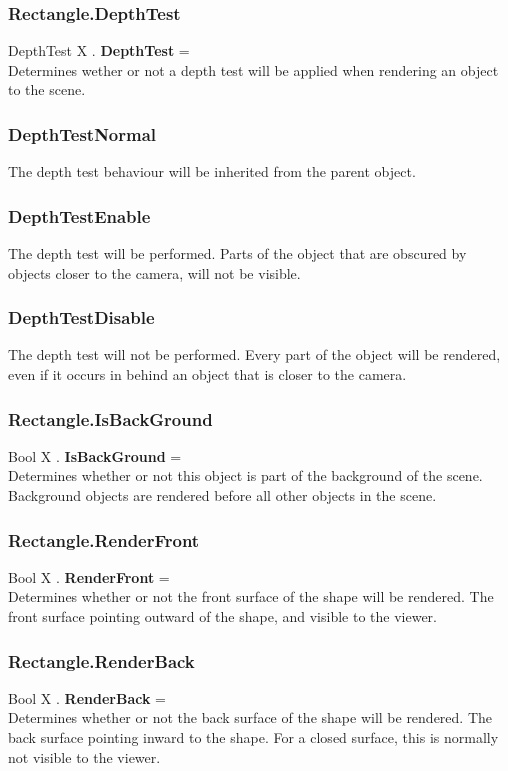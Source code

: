 \documentclass[10pt]{book}
\begin{document}
\subsubsection{Rectangle.DepthTest \label{F:Rectangle:DepthTest}}
DepthTest X . \textbf{DepthTest} = \\
Determines wether or not a depth test will be applied when rendering an object to the scene.

\subsubsection{DepthTestNormal \label{T:DepthTest|DepthTestNormal}}
The depth test behaviour will be inherited from the parent object.

\subsubsection{DepthTestEnable \label{T:DepthTest|DepthTestEnable}}
The depth test will be performed. Parts of the object that are obscured by objects closer to the camera, will not be visible.

\subsubsection{DepthTestDisable \label{T:DepthTest|DepthTestDisable}}
The depth test will not be performed. Every part of the object will be rendered, even if it occurs in behind an object that is closer to the camera.

\subsubsection{Rectangle.IsBackGround \label{F:Rectangle:IsBackGround}}
Bool X . \textbf{IsBackGround} = \\
Determines whether or not this object is part of the background of the scene. Background objects are rendered before all other objects in the scene.

\subsubsection{Rectangle.RenderFront \label{F:Rectangle:RenderFront}}
Bool X . \textbf{RenderFront} = \\
Determines whether or not the front surface of the shape will be rendered. The front surface pointing outward of the shape, and visible to the viewer.

\subsubsection{Rectangle.RenderBack \label{F:Rectangle:RenderBack}}
Bool X . \textbf{RenderBack} = \\
Determines whether or not the back surface of the shape will be rendered. The back surface pointing inward to the shape. For a closed surface, this is normally not visible to the viewer.
\end{document}
